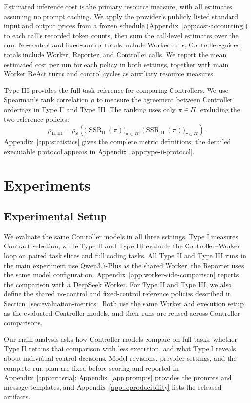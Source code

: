 Estimated inference cost is the primary resource measure, with all estimates assuming no prompt caching. We apply the provider's publicly listed standard input and output prices from a frozen schedule (Appendix~\ref{app:cost-accounting}) to each call's recorded token counts, then sum the call-level estimates over the run. No-control and fixed-control totals include Worker calls; Controller-guided totals include Worker, Reporter, and Controller calls. We report the mean estimated cost per run for each policy in both settings, together with main Worker ReAct turns and control cycles as auxiliary resource measures.

Type III provides the full-task reference for comparing Controllers. We use Spearman's rank correlation \(\rho\) to measure the agreement between Controller orderings in Type II and Type III. The ranking uses only \(\pi\in\Pi\), excluding the two reference policies:
\[
\rho_{\mathrm{II},\mathrm{III}}
=
\rho_{\mathrm{S}}\!\left(
\bigl(\operatorname{SSR}_{\mathrm{II}}(\pi)\bigr)_{\pi\in\Pi},
\bigl(\operatorname{SSR}_{\mathrm{III}}(\pi)\bigr)_{\pi\in\Pi}
\right).
\]
Appendix~\ref{app:statistics} gives the complete metric definitions; the detailed executable protocol appears in Appendix~\ref{app:type-ii-protocol}.

\section{Experiments}
\label{sec:experiments}

\subsection{Experimental Setup}

We evaluate the same Controller models in all three settings. Type I measures Contract selection, while Type II and Type III evaluate the Controller--Worker loop on paired task slices and full coding tasks. All Type II and Type III runs in the main experiment use Qwen3.7-Plus as the shared Worker; the Reporter uses the same model configuration. Appendix~\ref{app:worker-side-comparison} reports the comparison with a DeepSeek Worker. For Type II and Type III, we also define the shared no-control and fixed-control reference policies described in Section~\ref{sec:evaluation-metrics}. Both use the same Worker and execution setup as the evaluated Controller models, and their runs are reused across Controller comparisons.

Our main analysis asks how Controller models compare on full tasks, whether Type II retains that comparison with less execution, and what Type I reveals about individual control decisions. Model revisions, provider settings, and the complete run plan are fixed before scoring and reported in Appendix~\ref{app:criteria}; Appendix~\ref{app:prompts} provides the prompts and message templates, and Appendix~\ref{app:reproducibility} lists the released artifacts.

